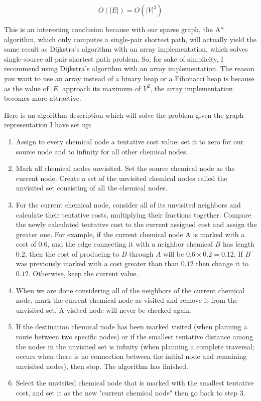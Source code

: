 \documentclass[11pt]{article}
\begin{document}
\begin{enumerate}[label=\textbf{\Alph*.}]
$$O(|E|) = O(|V|^2)$$

This is an interesting conclusion because with our sparse graph,
the A* algorithm, which only computes a single-pair shortest path,
will actually yield the same result as Dijkstra's algorithm with
an array implementation, which solves single-source all-pair shortest
path problem. So, for sake of simplicity, I recommend using Dijkstra's
algorithm with an array implementation. The reason you want to use 
an array instead of a binary heap or a Fibonacci heap is because
as the value of $|E|$ approach its maximum of $V^2$, the array implementation
becomes more attractive.

Here is an algorithm description which will solve the problem
given the graph representation I have set up:

\begin{enumerate}[label={\arabic*.}]
\item Assign to every chemical node a tentative cost value: set it to zero for our source node and to infinity for all other chemical nodes.
\item Mark all chemical nodes unvisited. Set the source chemical node as the current node. Create a set of the unvisited chemical nodes called the unvisited set consisting of all the chemical nodes.
\item For the current chemical node, consider all of its unvisited neighbors and calculate their tentative costs, multiplying their fractions together. Compare the newly calculated tentative cost to the current assigned cost and assign the greater one. For example, if the current chemical node A is marked with a cost of $0.6$, and the edge connecting it with a neighbor chemical $B$ has length $0.2$, then the cost of producing to $B$ through $A$ will be $0.6 \times 0.2 = 0.12$. If $B$ was previously marked with a cost greater than than $0.12$ then change it to $0.12$. Otherwise, keep the current value.
\item When we are done considering all of the neighbors of the current chemical node, mark the current chemical node as visited and remove it from the unvisited set. A visited node will never be checked again.
\item If the destination chemical node has been marked visited (when planning a route between two specific nodes) or if the smallest tentative distance among the nodes in the unvisited set is infinity (when planning a complete traversal; occurs when there is no connection between the initial node and remaining unvisited nodes), then stop. The algorithm has finished.
\item Select the unvisited chemical node that is marked with the smallest tentative cost, and set it as the new "current chemical node" then go back to step 3.
\end{enumerate}


\end{enumerate}
\end{document}
